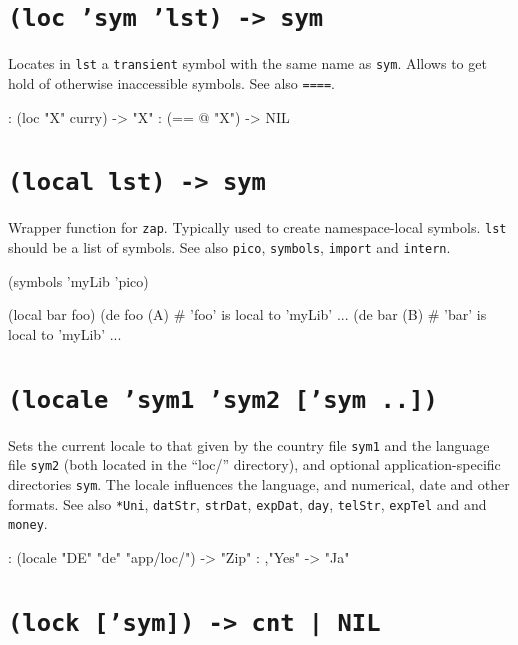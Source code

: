  
\section*{\texttt{(loc 'sym 'lst) -> sym}}
\label{sec:func-ref-L-(loc 'sym 'lst) -> sym}


Locates in \texttt{lst} a \texttt{transient} symbol with the same name as \texttt{sym}.
Allows to get hold of otherwise inaccessible symbols. See also \texttt{====}.


\begin{wideverbatim}
: (loc "X" curry)
-> "X"
: (== @ "X")
-> NIL
\end{wideverbatim}

 
\section*{\texttt{(local lst) -> sym}}
\label{sec:func-ref-L-(local lst) -> sym}


Wrapper function for \texttt{zap}. Typically used to create namespace-local
symbols. \texttt{lst} should be a list of symbols. See also \texttt{pico}, \texttt{symbols},
\texttt{import} and \texttt{intern}.


\begin{wideverbatim}
(symbols 'myLib 'pico)

(local bar foo)
(de foo (A)  # 'foo' is local to 'myLib'
   ...
(de bar (B)  # 'bar' is local to 'myLib'
   ...
\end{wideverbatim}

 
\section*{\texttt{(locale 'sym1 'sym2 ['sym ..])}}
\label{sec:func-ref-L-(locale 'sym1 'sym2 ['sym ..])}


Sets the current locale to that given by the country file \texttt{sym1} and the
language file \texttt{sym2} (both located in the ``loc/'' directory), and
optional application-specific directories \texttt{sym}. The locale influences
the language, and numerical, date and other formats. See also \texttt{*Uni},
\texttt{datStr}, \texttt{strDat}, \texttt{expDat}, \texttt{day}, \texttt{telStr}, \texttt{expTel} and and \texttt{money}.


\begin{wideverbatim}
: (locale "DE" "de" "app/loc/")
-> "Zip"
: ,"Yes"
-> "Ja"
\end{wideverbatim}

 
\section*{\texttt{(lock ['sym]) -> cnt | NIL}}
\label{sec:func-ref-L-(lock ['sym]) -> cnt | NIL}


